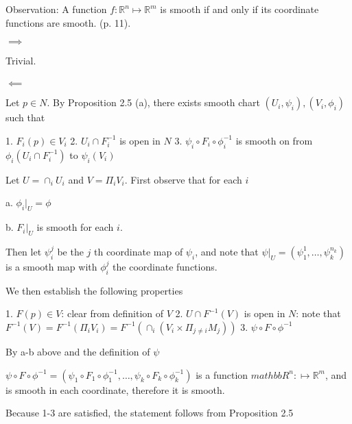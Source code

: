 Observation: A function $f:\mathbb{R}^n \mapsto \mathbb{R}^m$ is smooth if and only if its coordinate functions are smooth. (p. 11).

$\implies$

Trivial.
\\\\
$\impliedby$ 

Let $p \in N$.  By Proposition 2.5 (a), there exists smooth chart $(U_i, \psi_i), (V_i, \phi_i)$ such that 

1. $F_i(p) \in V_i$
2. $U_i \cap F_i^{-1}$ is open in $N$
3. $\psi_i \circ F_i \circ \phi_i^{-1}$ is smooth on from $\phi_i(U_i \cap F_i^{-1})$ to $\psi_i(V_i)$

Let $U = \cap_i U_i$ and $V = \Pi_i V_i$.  First observe that for each $i$

a. $\phi_i|_U = \phi$

b. $F_i|_U$ is smooth for each $i$.

Then let $\psi_i^j$ be the $j$ th coordinate map of $\psi_i$, and note that $\psi|_U = (\psi_1^1,\ldots, \psi_k^{n_k})$ is a smooth map with $\phi_i^j$ the coordinate functions.

We then establish the following properties

1. $F(p) \in V$: clear from definition of $V$
2. $U \cap F^{-1}(V)$ is open in $N$: note that $F^{-1}(V) = F^{-1}(\Pi_i V_i) = F^{-1}(\cap_i (V_i \times \Pi_{j \neq i} M_j))$
3. $\psi \circ F \circ \phi^{-1}$

By a-b above and the definition of $\psi$

$\psi \circ F \circ \phi^{-1} = (\psi_1 \circ F_1 \circ \phi_1^{-1}, \ldots, \psi_k \circ F_k \circ \phi_k^{-1})$ is a function $mathbb{R}^n: \mapsto \mathbb{R}^m$, and is smooth in each coordinate, therefore it is smooth.

Because 1-3 are satisfied, the statement follows from Proposition 2.5